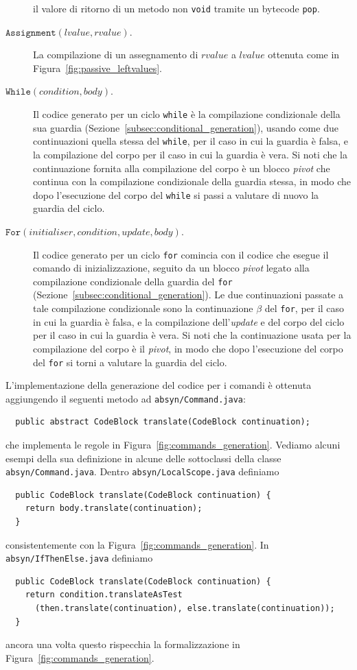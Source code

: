 \begin{description}
  il valore di ritorno di un metodo non \texttt{void} tramite un
  bytecode \texttt{pop}.
\item[\underline{$\mathtt{Assignment(\mathit{lvalue},\mathit{rvalue})}$}.]
  La compilazione di un assegnamento di $\mathit{rvalue}$ a
  $\mathit{lvalue}$ \e ottenuta come in Figura~\ref{fig:passive_leftvalues}.
\item[\underline{$\mathtt{While(\mathit{condition},\mathit{body})}$}.]
  Il codice generato per un ciclo \texttt{while} \`e la compilazione
  condizionale della sua guardia (Sezione~\ref{subsec:conditional_generation}),
  usando come due continuazioni quella stessa del \texttt{while}, per
  il caso in cui la guardia \`e falsa, e la compilazione del
  corpo per il caso in cui la guardia \`e vera. Si noti che la
  continuazione fornita alla compilazione del corpo \`e un blocco
  \textit{pivot}
  che continua con la compilazione condizionale della guardia stessa,
  in modo che dopo l'esecuzione del corpo del \texttt{while} si passi
  a valutare di nuovo la guardia del ciclo.
\item[\underline{$\mathtt{For(\mathit{initialiser},\mathit{condition},
  \mathit{update},\mathit{body})}$}.]
  Il codice generato per un ciclo \texttt{for} comincia con il codice
  che esegue il comando di inizializzazione, seguito da un blocco
  \textit{pivot} legato alla compilazione condizionale della guardia
  del \texttt{for} (Sezione~\ref{subsec:conditional_generation}).
  Le due continuazioni passate a tale compilazione condizionale sono
  la continuazione $\beta$ del \texttt{for}, per il caso in cui la
  guardia \`e falsa, e la compilazione dell'\textit{update} e del corpo
  del ciclo per il caso in cui la guardia \`e vera. Si noti che la
  continuazione usata per la compilazione del corpo \`e il \textit{pivot},
  in modo che dopo l'esecuzione del corpo del \texttt{for} si torni a valutare
  la guardia del ciclo.
\end{description}

L'implementazione della generazione del codice per i comandi \`e ottenuta
aggiungendo il seguenti metodo ad \texttt{absyn/Command.java}:
%
\begin{verbatim}
  public abstract CodeBlock translate(CodeBlock continuation);
\end{verbatim}
%
che implementa le regole in Figura~\ref{fig:commands_generation}.
Vediamo alcuni esempi della sua definizione in alcune
delle sottoclassi della classe \texttt{absyn/Command.java}.
Dentro \texttt{absyn/LocalScope.java} definiamo
%
\begin{verbatim}
  public CodeBlock translate(CodeBlock continuation) {
    return body.translate(continuation);
  }
\end{verbatim}
%
consistentemente con la Figura~\ref{fig:commands_generation}.
In \texttt{absyn/IfThenElse.java} definiamo
%
\begin{verbatim}
  public CodeBlock translate(CodeBlock continuation) {
    return condition.translateAsTest
      (then.translate(continuation), else.translate(continuation));
  }
\end{verbatim}
%
ancora una volta questo rispecchia la formalizzazione in
Figura~\ref{fig:commands_generation}.

